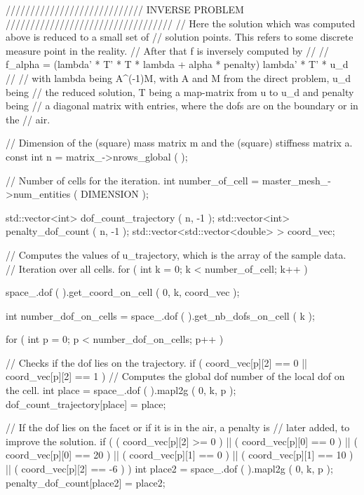 \documentclass[a4paper, 11pt, twoside]{article}
\begin{document}
\begin{code}
void DirectInverseTutorial::solve_system ( )
{
    LinearSolver<LAD>* solver_;
    LinearSolverFactory<LAD> SolFact;
    solver_ = SolFact.Get (
            params_["LinearSolver"]["Name"].get<std::string>( ) )->
            params ( params_["LinearSolver"] );

    solver_->SetupOperator ( *matrix_ );
    solver_->Solve ( *rhs_, sol_ );

\end{code}
%
\begin{code}
    //////////////////////////// INVERSE PROBLEM //////////////////////////////////
    // Here the solution which was computed above is reduced to a small set of
    // solution points. This refers to some discrete measure point in the reality.
    // After that f is inversely computed by
    //
    // f_alpha = (lambda' * T' * T * lambda + alpha * penalty) lambda' * T' * u_d
    //
    // with lambda being A^(-1)M, with A and M from the direct problem, u_d being
    // the reduced solution, T being a map-matrix from u to u_d and penalty being
    // a diagonal matrix with entries, where the dofs are on the boundary or in the
    // air.

    // Dimension of the (square) mass matrix m and the (square) stiffness matrix a.
    const int n = matrix_->nrows_global ( );

    // Number of cells for the iteration.
    int number_of_cell = master_mesh_->num_entities ( DIMENSION );

    std::vector<int> dof_count_trajectory ( n, -1 );
    std::vector<int> penalty_dof_count ( n, -1 );
    std::vector<std::vector<double> > coord_vec;
	\end{code}
	\begin{code}[caption={Computes $u$.}, label=sc:u]
    // Computes the values of u_trajectory, which is the array of the sample data.
    // Iteration over all cells.
    for ( int k = 0; k < number_of_cell; k++ )
    {
        space_.dof ( ).get_coord_on_cell ( 0, k, coord_vec );

        int number_dof_on_cells = space_.dof ( ).get_nb_dofs_on_cell ( k );

        for ( int p = 0; p < number_dof_on_cells; p++ )
        {
            // Checks if the dof lies on the trajectory.
            if ( coord_vec[p][2] == 0 || coord_vec[p][2] == 1 )
            {
                // Computes the global dof number of the local dof on the cell.
                int place = space_.dof ( ).mapl2g ( 0, k, p );
                dof_count_trajectory[place] = place;
            }

            // If the dof lies on the facet or if it is in the air, a penalty is
            // later added, to improve the solution.
            if ( ( coord_vec[p][2] >= 0 ) || ( coord_vec[p][0] == 0 ) ||
                 ( coord_vec[p][0] == 20 ) || ( coord_vec[p][1] == 0 ) ||
                 ( coord_vec[p][1] == 10 ) || ( coord_vec[p][2] == -6 ) )
            {
                int place2 = space_.dof ( ).mapl2g ( 0, k, p );
                penalty_dof_count[place2] = place2;
            }
        }
    }
	\end{code}
\end{document}
